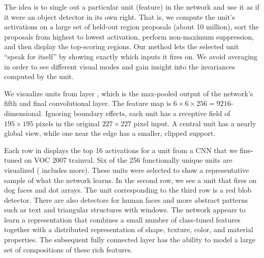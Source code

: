 The idea is to single out a particular unit (feature) in the network and use it as if it were an object
detector in its own right. That is, we compute the unit's activations on a
large set of held-out region proposals (about 10 million), sort the proposals from
highest to lowest activation, perform non-maximum suppression, and then display the top-scoring regions. Our method lets the selected unit
``speak for itself'' by showing exactly which inputs it fires on. We avoid
averaging in order to see different visual modes and gain
insight into the invariances computed by the unit.

We visualize units from layer , which is the max-pooled output of
the network's fifth and final convolutional layer.  
The  feature map is $6 \times 6 \times 256 = 9216$-dimensional. 
Ignoring boundary effects, each  unit has a receptive field of $195
\times 195$ pixels in the original $227 \times 227$ pixel input.
A central  unit has a nearly global view, while one near the edge has a smaller, clipped support.

Each row in  displays the top 16 activations for a  unit from a CNN that we fine-tuned on VOC 2007 trainval.
Six of the 256 functionally unique units are visualized ( includes more).
These units were selected to show a representative sample of what the network learns.
In the second row, we see a unit that fires on dog faces and dot arrays.
The unit corresponding to the third row is a red blob detector.
There are also detectors for human faces and more abstract patterns such as text and triangular structures with windows.
The network appears to learn a representation that combines a small number of class-tuned features together with a distributed representation of shape, texture, color, and material properties.
The subsequent fully connected layer  has the ability to model a large set of compositions of these rich features. 

